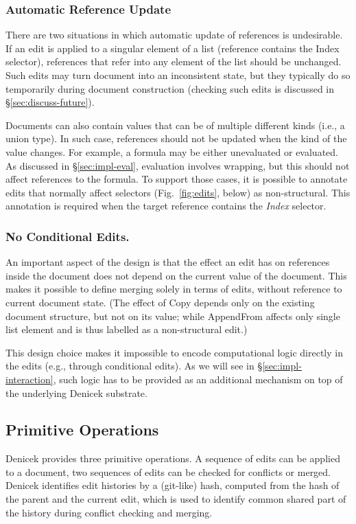 \documentclass[sigconf]{acmart}
\newcommand{\ident}[1]{{\sffamily #1}}
\begin{document}

\subsubsection*{Automatic Reference Update}
There are two situations in which automatic update of references is undesirable. If an edit is
applied to a singular element of a list (reference contains the \ident{Index} selector),
references that refer into any element of the list should be unchanged.  Such edits may turn
document into an inconsistent state, but they typically do so temporarily during document
construction (checking such edits is discussed in \S\ref{sec:discuss-future}).

Documents can also contain values that can be of multiple different kinds (i.e., a union type).
In such case, references should not be updated when the kind of the value changes. For example,
a formula may be either unevaluated or evaluated. As discussed in \S\ref{sec:impl-eval}, evaluation
involves wrapping, but this should not affect references to the formula.
To support those cases, it is possible to annotate edits that normally affect selectors
(Fig.~\ref{fig:edits}, below) as non-structural. This annotation is required when the
target reference contains the \emph{Index} selector.

\subsubsection*{No Conditional Edits.}
An important aspect of the design is that the effect an edit has on references inside
the document does not depend on the current value of the document. This makes it possible to
define merging solely in terms of edits, without reference to current document state.
(The effect of \ident{Copy} depends only on the existing document structure, but not on its value;
while \ident{AppendFrom} affects only single list element and is thus labelled as a
non-structural edit.)

This design choice makes it impossible to encode computational logic directly in the edits
(e.g., through conditional edits). As we will see in \S\ref{sec:impl-interaction}, such logic
has to be provided as an additional  mechanism on top of the underlying Denicek substrate.

\subsection{Primitive Operations}
\label{sec:system-ops}
Denicek provides three primitive operations. A sequence of edits can be applied to a document, two
sequences of edits can be checked for conflicts or merged. Denicek identifies edit histories by
a (git-like) hash, computed from the hash of the parent and the current edit, which is used to identify
common shared part of the history during conflict checking and merging.
\end{document}
